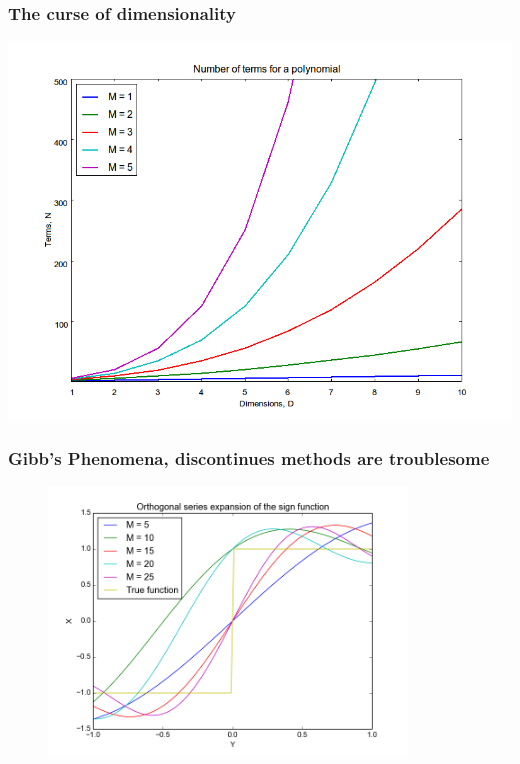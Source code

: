 \documentclass{beamer}
\begin{document}
\begin{frame}
  \frametitle{The curse of dimensionality}
  \includegraphics[height = 0.85\textheight]{dimensionality.png}

\end{frame}


\begin{frame}
  \frametitle{Gibb's Phenomena, discontinues methods are troublesome}
  \begin{figure}
  \includegraphics[width=0.85\textwidth]{gibbs.png}
  \end{figure}
  \end{frame}
\end{document}
